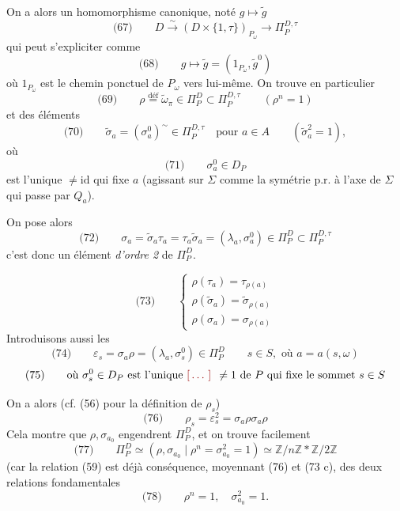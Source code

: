\documentclass[11pt,a4paper]{article}
\begin{document}
On a alors un homomorphisme canonique,  noté $g \mapsto \tilde g$ 
\[
  \text{(67)}\qquad D \xrightarrow{\ \sim\ } (D \times \{1,\tau\})_{P_\omega} \longrightarrow \Pi_P^{D,\tau}
\]
qui peut s'expliciter comme
\[
  \text{(68)}\qquad g \longmapsto \tilde g = (1_{P_\omega}, \tilde g^{0})
\]
où $1_{P_\omega}$ est le chemin  ponctuel de $P_\omega$ vers lui-même. On trouve en particulier
\[
  \text{(69)}\qquad \rho \overset{\text{déf}}{=} \tilde\omega_\pi \in \Pi_P^D \subset \Pi_P^{D,\tau} \qquad (\rho^n = 1)
\]
et des éléments
\[
  \text{(70)}\qquad \tilde\sigma_a = (\sigma_a^0)^{\sim} \in \Pi_P^{D,\tau} \quad \text{pour } a \in A \qquad (\tilde\sigma_a^2 = 1),
\]
où
\[
  \text{(71)}\qquad \sigma_a^0 \in D_P
\]
est l'unique \ill{} $\neq \mathrm{id}$ qui fixe $a$ (agissant sur $\Sigma$ comme la symétrie p.r. à l'axe de $\Sigma$ qui passe par $Q_a$).


On pose alors
\[
  \text{(72)}\qquad \sigma_a = \tilde\sigma_a \tau_a = \tau_a \tilde\sigma_a = (\lambda_a, \sigma_a^0) \in \Pi_P^D \subset \Pi_P^{D,\tau}
\]
c'est donc un élément \emph{d'ordre 2} de $\Pi_P^D$.

 
\[
  \text{(73)}\qquad
  \begin{cases}
    \rho(\tau_a) = \tau_{\rho(a)} \\
    \rho(\tilde\sigma_a) = \tilde\sigma_{\rho(a)} \\
    \rho(\sigma_a) = \sigma_{\rho(a)}
  \end{cases}
\]
Introduisons aussi les
\[
  \text{(74)}\qquad \varepsilon_s = \sigma_a \rho = (\lambda_a, \sigma_s^0) \in \Pi_P^D
  \qquad s \in S, \text{ où } a = a(s,\omega)
\]
\[
  \text{(75)}\qquad \text{où } \sigma_s^0 \in D_P \text{ est l'unique \ill{} } \neq 1 \text{ de } P \text{ qui fixe le sommet } s \in S
\]

On a alors (cf. (56) pour la définition de $\rho_s$)
\[
  \text{(76)}\qquad \rho_s = \varepsilon_s^2 = \sigma_a \rho \sigma_a \rho
\]
Cela  montre que $\rho, \sigma_{a_0}$ engendrent $\Pi_P^D$, et on trouve facilement
\[
  \text{(77)}\qquad \Pi_P^D \simeq (\rho, \sigma_{a_0} \mid \rho^n = \sigma_{a_0}^2 = 1) \simeq \mathbb{Z}/n\mathbb{Z} * \mathbb{Z}/2\mathbb{Z}
\]
(car la relation (59) est déjà conséquence, moyennant (76) et (73 c), des deux relations fondamentales
\[
  \text{(78)}\qquad \rho^n = 1, \quad \sigma_{a_0}^2 = 1 .
\]
\end{document}
